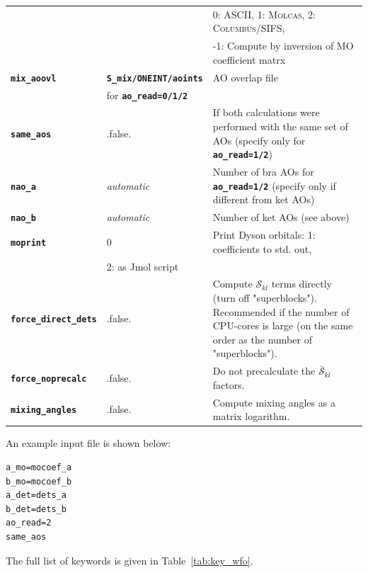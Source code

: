 \documentclass[a4paper,10pt,DIV=15,openany,twoside=false]{scrbook}
\newcommand{\ttt}[1]{\textbf{\texttt{#1}}}
\newenvironment{example}{
  \setlength{\OuterFrameSep}{3pt}
  \vspace{0mm}
  \definecolor{shadecolor}{HTML}{E4F4FF}
  \begin{shaded}
}{
  \end{shaded}
}
\begin{document}
\begin{table}[tb]
\begin{tabular}{llp{9cm}}
                                                                &&0: ASCII, 1: \textsc{Molcas}, 2: \textsc{Columbus/SIFS},\\
                                                                &&-1: Compute by inversion of MO coefficient matrx\\
    \ttt{mix\_aoovl}            & \ttt{S\_mix/ONEINT/aoints}    & AO overlap file\\
                                & for \ttt{ao\_read=0/1/2}      &\\
    \ttt{same\_aos}             & .false.                       & If both calculations were performed with the same set of AOs (specify only for \ttt{ao\_read=1/2})\\
    \ttt{nao\_a}                & \textit{automatic}            & Number of bra AOs for \ttt{ao\_read=1/2} (specify only if different from ket AOs) \\
    \ttt{nao\_b}                & \textit{automatic}            & Number of ket AOs (see above)  \\
    \ttt{moprint}               & 0                             & Print Dyson orbitals: 1: coefficients to std. out,\\
                                                                & 2: as Jmol script\\
    \ttt{force\_direct\_dets}   & .false.                       & Compute $\mathcal{S}_{kl}$ terms directly (turn off "superblocks").
                                                                Recommended if the number of CPU-cores is large (on the same order as the number of "superblocks").\\
    \ttt{force\_noprecalc}      & .false.                       & Do not precalculate the $\bar{\mathcal{S}}_{kl}$ factors.\\
    \ttt{mixing\_angles}        & .false.                       & Compute mixing angles as a matrix logarithm.\\
    \hline
  \end{tabular}
\end{table}

An example input file is shown below:
%
\begin{example}
\begin{verbatim}
a_mo=mocoef_a
b_mo=mocoef_b
a_det=dets_a
b_det=dets_b
ao_read=2
same_aos
\end{verbatim}
\end{example}
The full list of keywords is given in Table~\ref{tab:key_wfo}.
\end{document}
